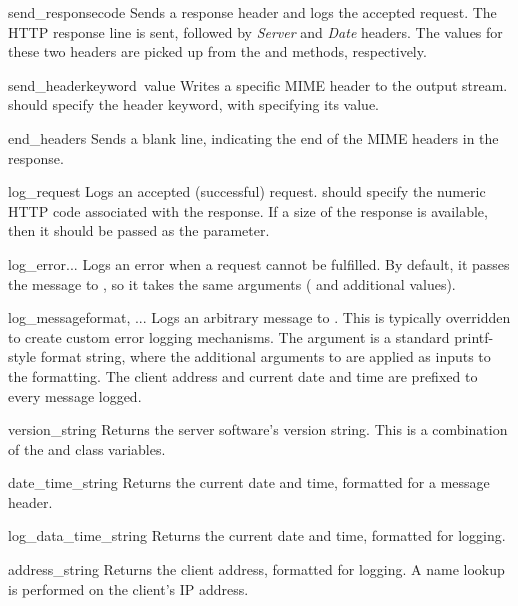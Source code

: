 \begin{funcdesc}{send_response}{code}
Sends a response header and logs the accepted request. The HTTP
response line is sent, followed by \emph{Server} and \emph{Date}
headers. The values for these two headers are picked up from the
 and  methods,
respectively.
\end{funcdesc}

\begin{funcdesc}{send_header}{keyword\, value}
Writes a specific MIME header to the output stream. 
should specify the header keyword, with  specifying
its value.
\end{funcdesc}

\begin{funcdesc}{end_headers}{}
Sends a blank line, indicating the end of the MIME headers in
the response.
\end{funcdesc}

\begin{funcdesc}{log_request}{}
Logs an accepted (successful) request.  should specify
the numeric HTTP code associated with the response. If a size of
the response is available, then it should be passed as the
 parameter.
\end{funcdesc}

\begin{funcdesc}{log_error}{...}
Logs an error when a request cannot be fulfilled. By default,
it passes the message to , so it takes the
same arguments ( and additional values).
\end{funcdesc}

\begin{funcdesc}{log_message}{format, ...}
Logs an arbitrary message to . This is typically
overridden to create custom error logging mechanisms. The
 argument is a standard printf-style format string,
where the additional arguments to  are applied
as inputs to the formatting. The client address and current date
and time are prefixed to every message logged.
\end{funcdesc}

\begin{funcdesc}{version_string}{}
Returns the server software's version string. This is a combination
of the  and  class variables.
\end{funcdesc}

\begin{funcdesc}{date_time_string}{}
Returns the current date and time, formatted for a message header.
\end{funcdesc}

\begin{funcdesc}{log_data_time_string}{}
Returns the current date and time, formatted for logging.
\end{funcdesc}

\begin{funcdesc}{address_string}{}
Returns the client address, formatted for logging. A name lookup
is performed on the client's IP address.
\end{funcdesc}
